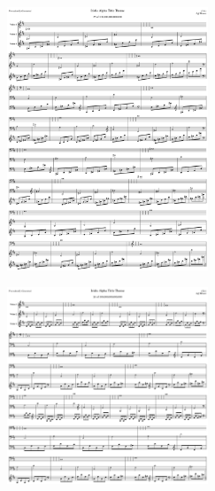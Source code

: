 \begin{figure}[H]                                             
{                                                             
  \setlength{\tabcolsep}{3.0pt}                               
  \setlength\cmidrulewidth{\heavyrulewidth} %
    \begin{subfigure}{0.5\textwidth}                            
  \includegraphics[width=6cm]{music/title_no_25_page_1001.png}%
    \end{subfigure}                                             
  \begin{subfigure}{0.5\textwidth}                            
  \includegraphics[width=6cm]{music/title_no_26_page_1001.png}%
    \end{subfigure}                                             
}                                                             
\end{figure}                                                  


